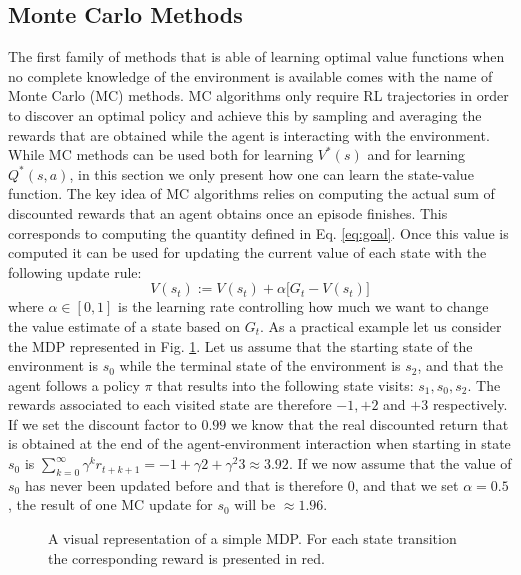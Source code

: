 \subsection{Monte Carlo Methods}
The first family of methods that is able of learning optimal value functions when no complete knowledge of the environment is available comes with the name of Monte Carlo (MC) methods. MC algorithms only require RL trajectories in order to discover an optimal policy and achieve this by sampling and averaging the rewards that are obtained while the agent is interacting with the environment. While MC methods can be used both for learning $V^{*}(s)$ and for learning $Q^{*}(s,a)$, in this section we only present how one can learn the state-value function. The key idea of MC algorithms relies on computing the actual sum of discounted rewards that an agent obtains once an episode finishes. This corresponds to computing the quantity defined in Eq. \ref{eq:goal}. Once this value is computed it can be used for updating the current value of each state with the following update rule: 
\begin{equation}
	V(s_t) := V(s_t) + \alpha \big[G_t - V(s_t) \big]
\label{eq:mc_update}
\end{equation}
where $\alpha \in [0,1]$ is the learning rate controlling how much we want to change the value estimate of a state based on $G_t$. As a practical example let us consider the MDP represented in Fig. \ref{fig:mdp}. Let us assume that the starting state of the environment is $s_0$ while the terminal state of the environment is $s_2$, and that the agent follows a policy $\pi$ that results into the following state visits: $s_1, s_0, s_2$. The rewards associated to each visited state are therefore $-1, +2$ and $+3$ respectively. If we set the discount factor to $0.99$ we know that the real discounted return that is obtained at the end of the agent-environment interaction when starting in state $s_0$ is $\sum_{k=0}^{\infty}\gamma^{k} r_{t+k+1} = -1+\gamma2+\gamma^{2}3 \approx 3.92$. If we now assume that the value of $s_0$ has never been updated before and that is therefore $0$, and that we set $\alpha=0.5$, the result of one MC update for $s_0$ will be $\approx 1.96$. 

\begin{figure}[ht!]
	\centering
	
\caption{A visual representation of a simple MDP. For each state transition the corresponding reward is presented in red.}
\label{fig:mdp}
\end{figure}

